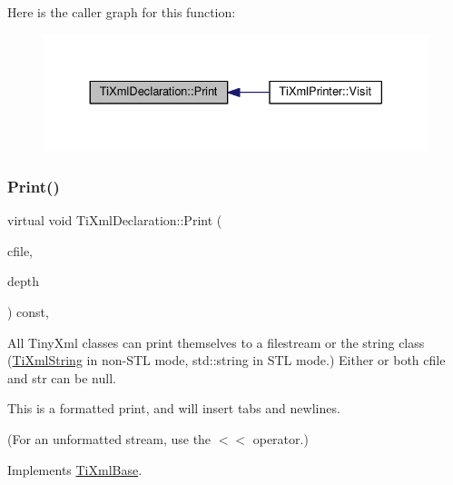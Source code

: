 Here is the caller graph for this function\+:
\nopagebreak
\begin{figure}[H]
\begin{center}
\leavevmode
\includegraphics[width=330pt]{class_ti_xml_declaration_ace687d02a5a25a060ae3802abb1b3f55_icgraph}
\end{center}
\end{figure}
\mbox{\label{class_ti_xml_declaration_ae46cff6565f299210ab945e78bf28514}} 
\subsubsection{\texorpdfstring{Print()}{Print()}\hspace{0.1cm}{\footnotesize\ttfamily [2/2]}}
{\footnotesize\ttfamily virtual void Ti\+Xml\+Declaration\+::\+Print (\begin{DoxyParamCaption}\item[{F\+I\+LE $\ast$}]{cfile,  }\item[{int}]{depth }\end{DoxyParamCaption}) const\hspace{0.3cm}{\ttfamily [inline]}, {\ttfamily [virtual]}}

All Tiny\+Xml classes can print themselves to a filestream or the string class (\hyperlink{class_ti_xml_string}{Ti\+Xml\+String} in non-\/\+S\+TL mode, std\+::string in S\+TL mode.) Either or both cfile and str can be null.

This is a formatted print, and will insert tabs and newlines.

(For an unformatted stream, use the $<$$<$ operator.) 

Implements \hyperlink{class_ti_xml_base_a0de56b3f2ef14c65091a3b916437b512}{Ti\+Xml\+Base}.

\mbox{\label{class_ti_xml_declaration_a1f2f8a741593d15a61e491e5024cacef}} 
